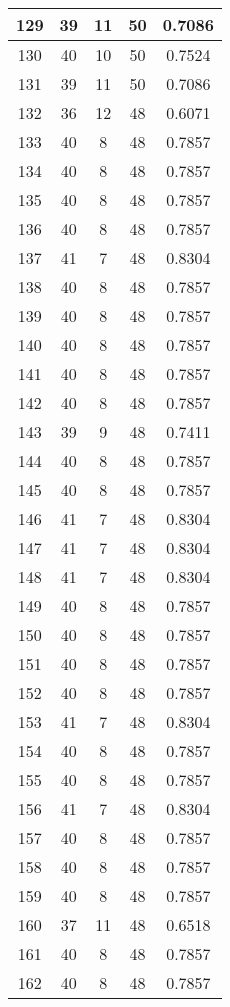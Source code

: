 \documentclass[letterpaper, 12pt]{article}
\begin{document}
\begin{longtable}{|c|c|c|c|c|}
\hline
129 & 39 & 11 & 50 & 0.7086 \\
\hline
130 & 40 & 10 & 50 & 0.7524 \\
\hline
131 & 39 & 11 & 50 & 0.7086 \\
\hline
132 & 36 & 12 & 48 & 0.6071 \\
\hline
133 & 40 & 8 & 48 & 0.7857 \\
\hline
134 & 40 & 8 & 48 & 0.7857 \\
\hline
135 & 40 & 8 & 48 & 0.7857 \\
\hline
136 & 40 & 8 & 48 & 0.7857 \\
\hline
137 & 41 & 7 & 48 & 0.8304 \\
\hline
138 & 40 & 8 & 48 & 0.7857 \\
\hline
139 & 40 & 8 & 48 & 0.7857 \\
\hline
140 & 40 & 8 & 48 & 0.7857 \\
\hline
141 & 40 & 8 & 48 & 0.7857 \\
\hline
142 & 40 & 8 & 48 & 0.7857 \\
\hline
143 & 39 & 9 & 48 & 0.7411 \\
\hline
144 & 40 & 8 & 48 & 0.7857 \\
\hline
145 & 40 & 8 & 48 & 0.7857 \\
\hline
146 & 41 & 7 & 48 & 0.8304 \\
\hline
147 & 41 & 7 & 48 & 0.8304 \\
\hline
148 & 41 & 7 & 48 & 0.8304 \\
\hline
149 & 40 & 8 & 48 & 0.7857 \\
\hline
150 & 40 & 8 & 48 & 0.7857 \\
\hline
151 & 40 & 8 & 48 & 0.7857 \\
\hline
152 & 40 & 8 & 48 & 0.7857 \\
\hline
153 & 41 & 7 & 48 & 0.8304 \\
\hline
154 & 40 & 8 & 48 & 0.7857 \\
\hline
155 & 40 & 8 & 48 & 0.7857 \\
\hline
156 & 41 & 7 & 48 & 0.8304 \\
\hline
157 & 40 & 8 & 48 & 0.7857 \\
\hline
158 & 40 & 8 & 48 & 0.7857 \\
\hline
159 & 40 & 8 & 48 & 0.7857 \\
\hline
160 & 37 & 11 & 48 & 0.6518 \\
\hline
161 & 40 & 8 & 48 & 0.7857 \\
\hline
162 & 40 & 8 & 48 & 0.7857 \\

\end{longtable}
\end{document}
